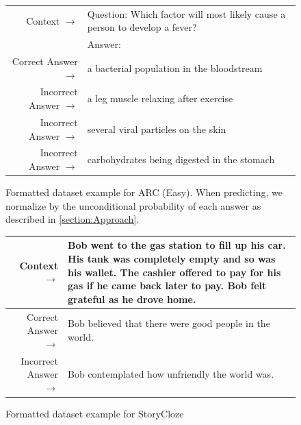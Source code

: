 \documentclass{article}
\begin{document}
\begin{figure} { \tt \footnotesize \begin{tabularx}{\linewidth}{r X} \toprule Context $\to$ & Question: Which factor will most likely cause a person to develop a fever? \\ 
 & Answer: \\ 
 \midrule Correct Answer $\to$ & a bacterial population in the bloodstream \\ 
 Incorrect Answer $\to$ & a leg muscle relaxing after exercise \\ 
 Incorrect Answer $\to$ & several viral particles on the skin \\ 
 Incorrect Answer $\to$ & carbohydrates being digested in the stomach\\ \bottomrule \end{tabularx} }

 \caption{Formatted dataset example for ARC (Easy). When predicting, we normalize by the unconditional probability of each answer as described in \ref{section:Approach}.}  \label{eval:ARC (Easy)}  \end{figure}
\clearpage
\begin{figure} { \tt \footnotesize \begin{tabularx}{\linewidth}{r X} \toprule Context $\to$ & Bob went to the gas station to fill up his car. His tank was completely empty and so was his wallet. The cashier offered to pay for his gas if he came back later to pay. Bob felt grateful as he drove home. \\
 \midrule Correct Answer $\to$ & Bob believed that there were good people in the world. \\ 
 Incorrect Answer $\to$ & Bob contemplated how unfriendly the world was.\\ \bottomrule \end{tabularx} }  \caption{Formatted dataset example for StoryCloze}  \label{eval:StoryCloze}  \end{figure}
\end{document}
